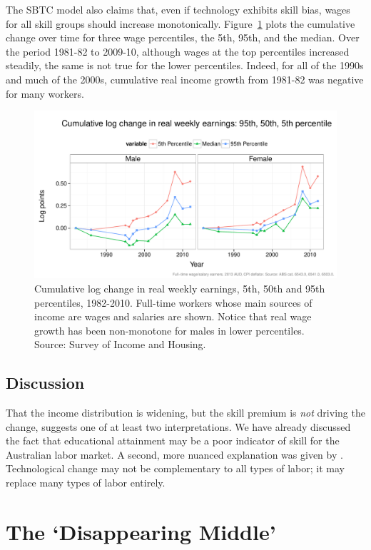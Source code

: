 The SBTC model also claims that, even if technology exhibits skill bias, wages for all skill groups should increase monotonically. Figure~\ref{fig:changetime} plots the cumulative change over time for three wage percentiles, the 5th, 95th, and the median. Over the period 1981-82 to 2009-10, although wages at the top percentiles increased steadily, the same is not true for the lower percentiles. Indeed, for all of the 1990s and much of the 2000s, cumulative real income growth from 1981-82 was negative for many workers.
\begin{figure}
  \centering
  \includegraphics[width=\textwidth]{../figure/wage_change_time.pdf}
  \caption{Cumulative log change in real weekly earnings, 5th, 50th and 95th percentiles, 1982-2010. Full-time workers whose main sources of income are wages and salaries are shown. Notice that real wage growth has been non-monotone for males in lower percentiles. Source: Survey of Income and Housing.}
  \label{fig:changetime}
\end{figure}

\subsection{Discussion}

That the income distribution is widening, but the skill premium is {\em not} driving the change, suggests one of at least two interpretations. We have already discussed the fact that educational attainment may be a poor indicator of skill for the Australian labor market. A second, more nuanced explanation was given by \citet{Levy2003}. Technological change may not be complementary to all types of labor; it may replace many types of labor entirely.

\section{The `Disappearing Middle'}

